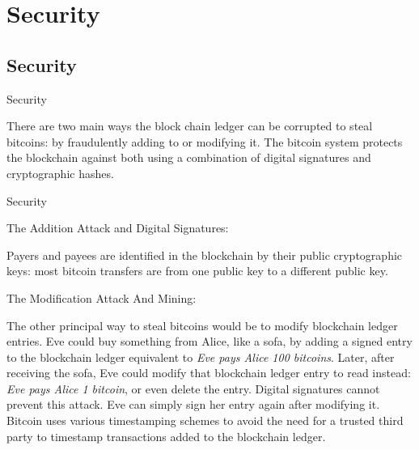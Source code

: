 \documentclass[handout]{beamer}
\begin{document}
\section{Security}
\subsection{Security}
\begin{frame}{Security}{}
 
There are two main ways the block chain ledger can be corrupted to steal bitcoins: by fraudulently adding to or modifying it. The bitcoin system protects the blockchain against both using a combination of digital signatures and cryptographic hashes. 

\end{frame}

\begin{frame}{Security}{}

  \begin{block}{The Addition Attack and Digital Signatures: }
 
 Payers and payees are identified in the blockchain by their public cryptographic keys: most bitcoin transfers are from one public key to a different public key. 
\end{block}

 \begin{block}{The Modification Attack And Mining:}
 
 The other principal way to steal bitcoins would be to modify blockchain ledger entries. Eve could buy something from Alice, like a sofa, by adding a signed entry to the blockchain ledger equivalent to \textit{Eve pays Alice 100 bitcoins}. Later, after receiving the sofa, Eve could modify that blockchain ledger entry to read instead:\textit{ Eve pays Alice 1 bitcoin}, or even delete the entry. Digital signatures cannot prevent this attack. Eve can simply sign her entry again after modifying it. Bitcoin uses various timestamping schemes to avoid the need for a trusted third party to timestamp transactions added to the blockchain ledger.
 
 \end{block}
 
\end{frame}


{\1
\begin{frame}
\end{frame}}
\end{document}

